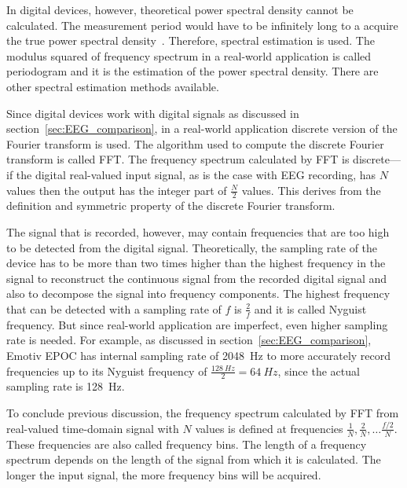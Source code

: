 In digital devices, however, theoretical \gls{power spectral density} cannot be calculated. The measurement period would have to be infinitely long to a acquire the true \gls{power spectral density}~\cite{psd}. Therefore, spectral estimation is used. The modulus squared of frequency spectrum in a real-world application is called \gls{periodogram} and it is the estimation of the \gls{power spectral density}. There are other spectral estimation methods available.

Since digital devices work with \glspl{digital signal} as discussed in section~\ref{sec:EEG_comparison}, in a real-world application discrete version of the \gls{Fourier transform} is used. The algorithm used to compute the discrete \gls{Fourier transform} is called \gls{FFT}. The \gls{frequency spectrum} calculated by \gls{FFT} is discrete---if the digital real-valued input signal, as is the case with \gls{EEG} recording, has $N$ values then the output has the integer part of $\frac{N}{2}$ values. This derives from the definition and symmetric property of the discrete \gls{Fourier transform}. %

The signal that is recorded, however, may contain frequencies that are too high to be detected from the \gls{digital signal}. Theoretically, the \gls{sampling rate} of the device has to be more than two times higher than the highest frequency in the signal to reconstruct the continuous signal from the recorded \gls{digital signal} and also to decompose the signal into \glspl{frequency component}. The highest frequency that can be detected with a \gls{sampling rate} of $f$ is $\frac{2}{f}$ and it is called \gls{Nyguist frequency}. But since real-world application are imperfect, even higher \gls{sampling rate} is needed. For example, as discussed in section~\ref{sec:EEG_comparison}, Emotiv EPOC has internal \gls{sampling rate} of \SI{2048}{Hz} to more accurately record frequencies up to its \gls{Nyguist frequency} of $\frac{\SI{128}{Hz}}{2}=\SI{64}{Hz}$, since the actual \gls{sampling rate} is \SI{128}{Hz}.

To conclude previous discussion, the \gls{frequency spectrum} calculated by \gls{FFT} from real-valued time-domain signal with $N$ values is defined at frequencies $\frac{1}{N}, \frac{2}{N}, \dots\frac{f/2}{N}$. These frequencies are also called \glspl{frequency bin}. The length of a \gls{frequency spectrum} depends on the length of the signal from which it is calculated. The longer the input signal, the more \glspl{frequency bin} will be acquired.

